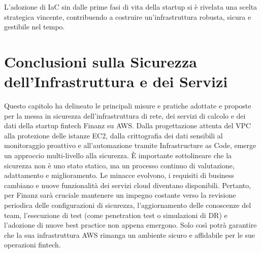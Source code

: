 L'adozione di IaC sin dalle prime fasi di vita della startup si è rivelata una scelta strategica vincente, contribuendo a costruire un'infrastruttura robusta, sicura e gestibile nel tempo.

\section{Conclusioni sulla Sicurezza dell'Infrastruttura e dei Servizi}
Questo capitolo ha delineato le principali misure e pratiche adottate e proposte per la messa in sicurezza dell'infrastruttura di rete, dei servizi di calcolo e dei dati della startup fintech Finanz su AWS. Dalla progettazione attenta del VPC alla protezione delle istanze EC2, dalla crittografia dei dati sensibili al monitoraggio proattivo e all'automazione tramite Infrastructure as Code, emerge un approccio multi-livello alla sicurezza.
È importante sottolineare che la sicurezza non è uno stato statico, ma un processo continuo di valutazione, adattamento e miglioramento. Le minacce evolvono, i requisiti di business cambiano e nuove funzionalità dei servizi cloud diventano disponibili. Pertanto, per Finanz sarà cruciale mantenere un impegno costante verso la revisione periodica delle configurazioni di sicurezza, l'aggiornamento delle conoscenze del team, l'esecuzione di test (come penetration test o simulazioni di DR) e l'adozione di nuove best practice non appena emergono. Solo così potrà garantire che la sua infrastruttura AWS rimanga un ambiente sicuro e affidabile per le sue operazioni fintech.